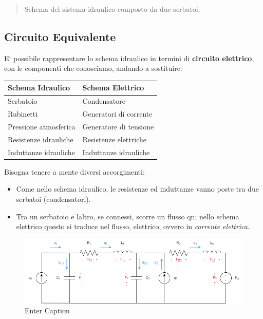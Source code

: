 \documentclass[
]{article}
\begin{document}
\begin{quote}
Schema del sistema idraulico composto da due serbatoi.
\end{quote}

\hypertarget{circuito-equivalente}{%
\subsection{Circuito Equivalente}\label{circuito-equivalente}}

E` possibile rappresentare lo schema idraulico in termini di
\textbf{circuito elettrico}, con le componenti che conosciamo, andando a
sostituire:

\begin{longtable}[]{@{}ll@{}}
\toprule\noalign{}
Schema Idraulico & Schema Elettrico \\
\midrule\noalign{}
\endhead
\bottomrule\noalign{}
\endlastfoot
Serbatoio & Condensatore \\
Rubinetti & Generatori di corrente \\
Pressione atmosferica & Generatore di tensione \\
Resistenze idrauliche & Resistenze elettriche \\
Induttanze idrauliche & Induttanze idrauliche \\
\end{longtable}

Bisogna tenere a mente diversi accorgimenti:

\begin{itemize}
\item
  Come nello schema idraulico, le resistenze ed induttanze vanno poste
  tra due serbatoi (condensatori).
\item
  Tra un serbatoio e l\textquotesingle altro, se connessi, scorre un
  flusso qn; nello schema elettrico questo si traduce nel flusso,
  elettrico, ovvero in \emph{corrente elettrica}.
\end{itemize}

\begin{figure}
    \centering
    \includegraphics[width=1\linewidth]{images/CircuitoEquivalenteRichLight.png}
    \caption{Enter Caption}
    \label{fig:enter-label}
\end{figure}
\end{document}

